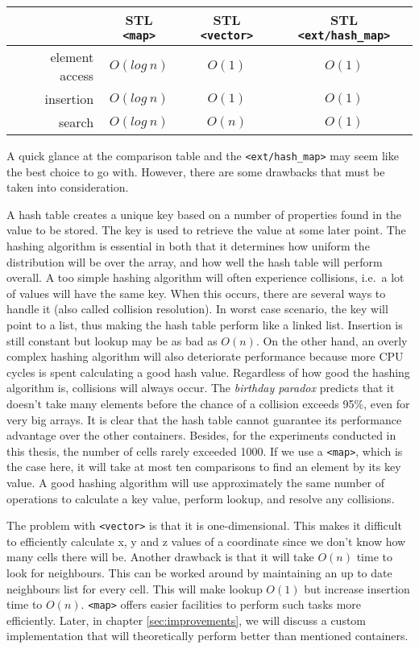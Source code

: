 \begin{center}
	\begin{tabular}{ r | c | c | c }
		~ & STL \texttt{<map>} & STL \texttt{<vector>} & STL \texttt{<ext/hash\_map>} \\
		\hline
		element access & $O(log~n)$ & $O(1)$ & $O(1)$ \\
		\hline
		insertion & $O(log~n)$ & $O(1)$ & $O(1)$ \\
		\hline
		search & $O(log~n)$ & $O(n)$ & $O(1)$ \\
	\end{tabular}
	\label{tbl:speed}
\end{center}

A quick glance at the comparison table and the \texttt{<ext/hash\_map>} may seem like the best choice to go with. However, there are some drawbacks that must be taken into consideration.

A hash table creates a unique key based on a number of properties found in the value to be stored. The key is used to retrieve the value at some later point. The hashing algorithm is essential in both that it determines how uniform the distribution will be over the array, and how well the hash table will perform overall. A too simple hashing algorithm will often experience collisions, i.e.\ a lot of values will have the same key. When this occurs, there are several ways to handle it (also called collision resolution). In worst case scenario, the key will point to a list, thus making the hash table perform like a linked list. Insertion is still constant but lookup may be as bad as $O(n)$. On the other hand, an overly complex hashing algorithm will also deteriorate performance because more CPU cycles is spent calculating a good hash value. Regardless of how good the hashing algorithm is, collisions will always occur. The \emph{birthday paradox} predicts that it doesn't take many elements before the chance of a collision exceeds 95\%, even for very big arrays. It is clear that the hash table cannot guarantee its performance advantage over the other containers. Besides, for the experiments conducted in this thesis, the number of cells rarely exceeded 1000. If we use a \texttt{<map>}, which is the case here, it will take at most ten comparisons to find an element by its key value. A good hashing algorithm will use approximately the same number of operations to calculate a key value, perform lookup, and resolve any collisions.

The problem with \texttt{<vector>} is that it is one-dimensional. This makes it difficult to efficiently calculate x, y and z values of a coordinate since we don't know how many cells there will be. Another drawback is that it will take $O(n)$ time to look for neighbours. This can be worked around by maintaining an up to date neighbours list for every cell. This will make lookup $O(1)$ but increase insertion time to $O(n)$. \texttt{<map>} offers easier facilities to perform such tasks more efficiently. Later, in chapter \ref{sec:improvements}, we will discuss a custom implementation that will theoretically perform better than mentioned containers.



